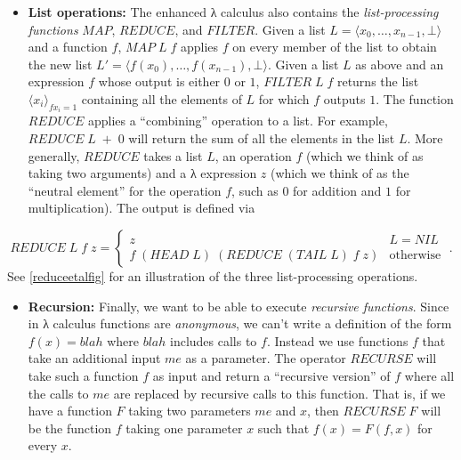 \begin{itemize}
\tightlist
\item
  \textbf{List operations:} The enhanced λ calculus also contains the
  \emph{list-processing functions} \(\ensuremath{\mathit{MAP}}\),
  \(\ensuremath{\mathit{REDUCE}}\), and
  \(\ensuremath{\mathit{FILTER}}\). Given a list
  \(L= \langle x_0,\ldots,x_{n-1}, \bot \rangle\) and a function \(f\),
  \(\ensuremath{\mathit{MAP}}\; L \; f\) applies \(f\) on every member
  of the list to obtain the new list
  \(L'= \langle f(x_0),\ldots,f(x_{n-1}), \bot \rangle\). Given a list
  \(L\) as above and an expression \(f\) whose output is either \(0\) or
  \(1\), \(\ensuremath{\mathit{FILTER}}\; L\; f\) returns the list
  \(\langle x_i \rangle_{f x_i = 1}\) containing all the elements of
  \(L\) for which \(f\) outputs \(1\). The function
  \(\ensuremath{\mathit{REDUCE}}\) applies a ``combining'' operation to
  a list. For example, \(\ensuremath{\mathit{REDUCE}}\; L \; + \; 0\)
  will return the sum of all the elements in the list \(L\). More
  generally, \(\ensuremath{\mathit{REDUCE}}\) takes a list \(L\), an
  operation \(f\) (which we think of as taking two arguments) and a λ
  expression \(z\) (which we think of as the ``neutral element'' for the
  operation \(f\), such as \(0\) for addition and \(1\) for
  multiplication). The output is defined via
\end{itemize}

\[\ensuremath{\mathit{REDUCE}}\;L\;f\;z = \begin{cases}z & L=\ensuremath{\mathit{NIL}} \\ f\;(\ensuremath{\mathit{HEAD}}\; L) \; (\ensuremath{\mathit{REDUCE}}\;(\ensuremath{\mathit{TAIL}}\; L)\;f\;z)  & \text{otherwise}\end{cases}\;.\]
See \cref{reduceetalfig} for an illustration of the three
list-processing operations.

\begin{itemize}
\tightlist
\item
  \textbf{Recursion:} Finally, we want to be able to execute
  \emph{recursive functions}. Since in λ calculus functions are
  \emph{anonymous}, we can't write a definition of the form
  \(f(x) = blah\) where \(blah\) includes calls to \(f\). Instead we use
  functions \(f\) that take an additional input \(me\) as a parameter.
  The operator \(\ensuremath{\mathit{RECURSE}}\) will take such a
  function \(f\) as input and return a ``recursive version'' of \(f\)
  where all the calls to \(me\) are replaced by recursive calls to this
  function. That is, if we have a function \(F\) taking two parameters
  \(me\) and \(x\), then \(\ensuremath{\mathit{RECURSE}}\; F\) will be
  the function \(f\) taking one parameter \(x\) such that
  \(f(x) = F(f,x)\) for every \(x\).
\end{itemize}

